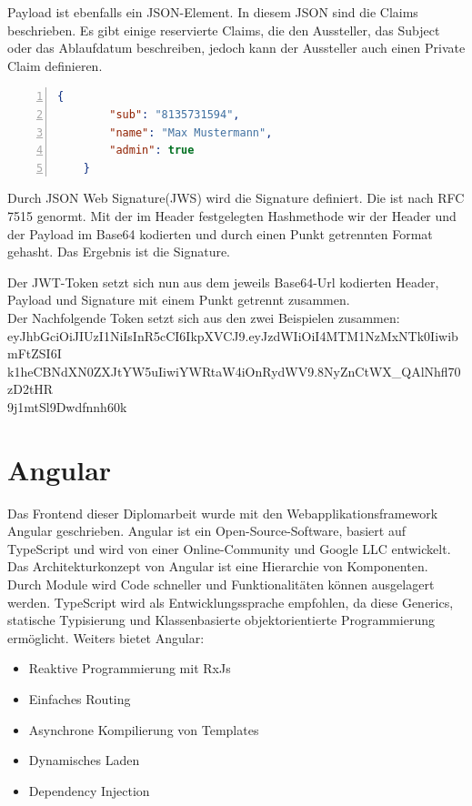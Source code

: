Payload ist ebenfalls ein JSON-Element. In diesem JSON sind die Claims beschrieben. Es gibt einige reservierte Claims, die den Aussteller, das Subject oder das Ablaufdatum beschreiben, jedoch kann der Aussteller auch einen Private Claim definieren. \autocite{wikiJWT} \\
\begin{lstlisting}[caption={JWT-Payload Beispiel},captionpos=b, numbers=left, backgroundcolor=\color{black!10}, language=json]
	{
		"sub": "8135731594",
		"name": "Max Mustermann",
		"admin": true
	}
\end{lstlisting}

Durch JSON Web Signature(JWS) wird die Signature definiert. Die ist nach RFC 7515 genormt. Mit der im Header festgelegten Hashmethode wir der Header und der Payload im Base64 kodierten und durch einen Punkt getrennten Format gehasht. Das Ergebnis ist die Signature. \autocite{wikiJWT}

Der JWT-Token setzt sich nun aus dem jeweils Base64-Url kodierten Header, Payload und Signature mit einem Punkt getrennt zusammen. \autocite{wikiJWT} \\
Der Nachfolgende Token setzt sich aus den zwei Beispielen zusammen:\\
eyJhbGciOiJIUzI1NiIsInR5cCI6IkpXVCJ9.eyJzdWIiOiI4MTM1NzMxNTk0IiwibmFtZSI6I\\k1heCBNdXN0ZXJtYW5uIiwiYWRtaW4iOnRydWV9.8NyZnCtWX\_QAlNhfl70zD2tHR\\9j1mtSl9Dwdfnnh60k

\section{Angular}
Das Frontend dieser Diplomarbeit wurde mit den Webapplikationsframework Angular geschrieben. Angular ist ein Open-Source-Software, basiert auf TypeScript und wird von einer Online-Community und Google LLC entwickelt.\\
Das Architekturkonzept von Angular ist eine Hierarchie von Komponenten. Durch Module wird Code schneller und Funktionalitäten können ausgelagert werden. TypeScript wird als Entwicklungssprache empfohlen, da diese Generics, statische Typisierung und Klassenbasierte objektorientierte Programmierung ermöglicht. \autocite{wikiAngular}
Weiters bietet Angular:
\begin{itemize}
	\item Reaktive Programmierung mit RxJs
	\item Einfaches Routing
	\item Asynchrone Kompilierung von Templates
	\item Dynamisches Laden
	\item Dependency Injection
\end{itemize}

